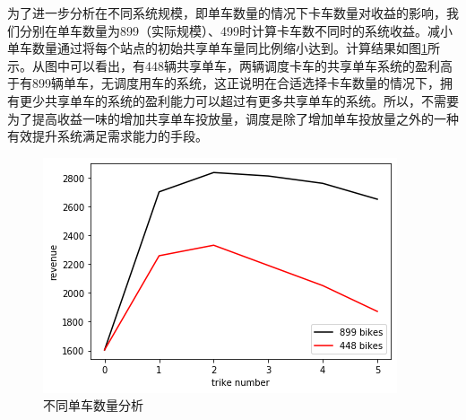 \documentclass[]{tongjithesis}
\numberwithin{equation}{chapter}
\begin{document}
为了进一步分析在不同系统规模，即单车数量的情况下卡车数量对收益的影响，我们分别在单车数量为899（实际规模）、499时计算卡车数不同时的系统收益。减小单车数量通过将每个站点的初始共享单车量同比例缩小达到。计算结果如图\ref{trike_compare}所示。从图中可以看出，有448辆共享单车，两辆调度卡车的共享单车系统的盈利高于有899辆单车，无调度用车的系统，这正说明在合适选择卡车数量的情况下，拥有更少共享单车的系统的盈利能力可以超过有更多共享单车的系统。所以，不需要为了提高收益一味的增加共享单车投放量，调度是除了增加单车投放量之外的一种有效提升系统满足需求能力的手段。

\begin{figure}[H]
    \centering
    \includegraphics[width=0.5 \textwidth]{figures_main/sens_trike_compare.png}
    \caption{不同单车数量分析}
    \label{trike_compare}
\end{figure}
\end{document}
